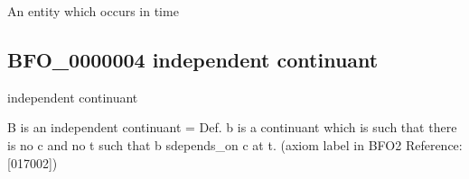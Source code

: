 \documentclass[letterpaper,10pt,english]{sphinxmanual}
\begin{document}
\begin{sphinxShadowBox}

\sphinxAtStartPar
An entity which occurs in time
\end{sphinxShadowBox}

\begin{sphinxShadowBox}

\sphinxAtStartPar
{}
\end{sphinxShadowBox}
\begin{quote}

\ignorespaces \end{quote}


\subsection{BFO\_0000004 \sphinxhyphen{} independent continuant}
\label{\detokenize{doc-BFO_0000004:bfo-0000004-independent-continuant}}\label{\detokenize{doc-BFO_0000004:index-0}}\label{\detokenize{doc-BFO_0000004::doc}}
\begin{sphinxShadowBox}

\sphinxAtStartPar
independent continuant
\end{sphinxShadowBox}

\begin{sphinxShadowBox}

\sphinxAtStartPar
{\hyperref[\detokenize{doc-BFO_0000002::doc}]{}}
\end{sphinxShadowBox}

\begin{sphinxShadowBox}

\sphinxAtStartPar
B is an independent continuant = Def. b is a continuant which is such that there is no c and no t such that b s\sphinxhyphen{}depends\_on c at t. (axiom label in BFO2 Reference: {[}017\sphinxhyphen{}002{]})
\end{sphinxShadowBox}
\end{document}
